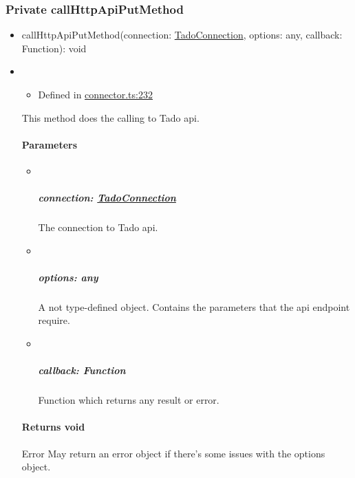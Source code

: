 \documentclass[]{article}
\providecommand{\tightlist}{%
  \setlength{\itemsep}{0pt}\setlength{\parskip}{0pt}}
\let\oldparagraph\paragraph
\renewcommand{\paragraph}[1]{\oldparagraph{#1}\mbox{}}
\let\oldsubparagraph\subparagraph
\renewcommand{\subparagraph}[1]{\oldsubparagraph{#1}\mbox{}}
\begin{document}
\protect\hypertarget{callhttpapiputmethod}{}{}

\hypertarget{private-callhttpapiputmethod}{%
\subsubsection{\texorpdfstring{{Private}
callHttpApiPutMethod}{Private callHttpApiPutMethod}}\label{private-callhttpapiputmethod}}

\begin{itemize}
\tightlist
\item
  callHttpApiPutMethod{(}connection{:
  }\href{_connector_.tadoconnection.html}{TadoConnection}, options{:
  }{any}, callback{: }{Function}{)}{: }{void}
\end{itemize}

\begin{itemize}
\item
  \begin{itemize}
  \tightlist
  \item
    Defined in
    \href{https://github.com/BFMBFramework/TadoConnector/blob/f05932b/src/connector.ts\#L232}{connector.ts:232}
  \end{itemize}

  This method does the calling to Tado api.

  \hypertarget{parameters-2}{%
  \paragraph{Parameters}\label{parameters-2}}

  \begin{itemize}
  \item ~
    \hypertarget{connection-tadoconnection-1}{%
    \subparagraph{\texorpdfstring{connection:
    \href{_connector_.tadoconnection.html}{TadoConnection}}{connection: TadoConnection}}\label{connection-tadoconnection-1}}

    The connection to Tado api.
  \item ~
    \hypertarget{options-any-2}{%
    \subparagraph{\texorpdfstring{options:
    {any}}{options: any}}\label{options-any-2}}

    A not type-defined object. Contains the parameters that the api
    endpoint require.
  \item ~
    \hypertarget{callback-function-2}{%
    \subparagraph{\texorpdfstring{callback:
    {Function}}{callback: Function}}\label{callback-function-2}}

    Function which returns any result or error.
  \end{itemize}

  \hypertarget{returns-void-2}{%
  \paragraph{\texorpdfstring{Returns
  {void}}{Returns void}}\label{returns-void-2}}

  Error May return an error object if there's some issues with the
  options object.
\end{itemize}
\end{document}
